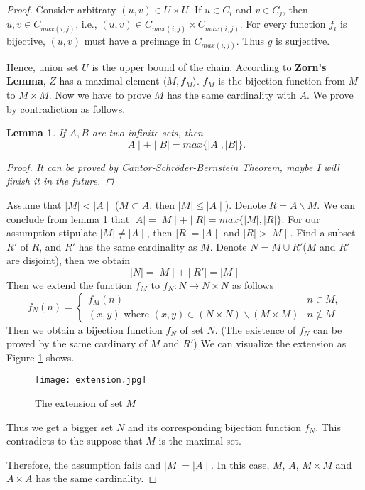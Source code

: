 \documentclass{article}
\newtheorem{lemma}[theorem]{Lemma}
\begin{document}
\begin{proof}
    Consider arbitraty $(u,v)\in U \times U.$ 
    If $u \in C_i$ and $v\in C_j$, then $u,v \in C_{max(i,j)}$,
     i.e., $(u,v)\in C_{max(i,j)} \times C_{max(i,j)}$. 
    For every function $f_i$ is bijective, $(u,v)$ must have a preimage in $C_{max(i,j)}$.
    Thus $g$ is surjective.

    Hence, union set $U$ is the upper bound of the chain.
    According to \textbf{Zorn's Lemma}, $Z$ has a maximal element $\langle M,f_M\rangle $.
    $f_M$ is the bijection function from $M$ to $M\times M.$
    Now we have to prove $M$ has the same cardinality with $A$.
    We prove by contradiction as follows.
    \begin{lemma}
        If $A,B$ are two infinite sets, then 
        $$\mid A\mid +\mid B\mid = max\{\mid A\mid,\mid B\mid\}.$$
    
        \begin{proof}
           It can be proved by Cantor-Schröder-Bernstein Theorem, 
           maybe I will finish it in the future.
        \end{proof}
    \end{lemma}

    Assume that $\mid M\mid < \mid A\mid$ ($M\subset A$, then $\mid M\mid \leq \mid A\mid$).
    Denote $R = A\backslash M.$ We can conclude from lemma 1 that 
    $\mid A \mid=\mid M\mid+\mid R\mid= max\{\mid M\mid,\mid R\mid\}.$ 
    For our assumption stipulate $\mid M\mid \not= \mid A\mid$,
     then $\mid R\mid = \mid A\mid$ and $\mid R\mid > \mid M\mid.$
    Find a subset $R'$ of $R$, and $R'$ has the same cardinality as $M$.
    Denote $N = M\cup R'$($M$ and $R'$ are disjoint), then we obtain
    $$\mid N\mid = \mid M\mid + \mid R'\mid = \mid M\mid$$
    Then we extend the function $f_M$ to $f_N: N\mapsto N\times N$ as follows
    \[
        f_N(n) = 
        \begin{cases}
            f_M(n) &  n \in M,\\
            (x,y) \text{ where }(x,y)\in (N\times N)\backslash (M\times M)& n\notin M
        \end{cases}
    \]
        Then we obtain a bijection function $f_N$ of set $N$. 
        (The existence of $f_N$ can be proved by the same cardinary of $M$ and $R'$)
    We can visualize the extension as Figure \ref{extension} shows.
    \begin{figure}[h]
        \centering
        \texttt{[image: extension.jpg]}
        \caption{The extension of set $M$}
        \label{extension}
    \end{figure}
    Thus we get a bigger set $N$ and its corresponding bijection function $f_N$.
    This contradicts to the suppose that  $M$ is the maximal set.

    Therefore, the assumption fails and $\mid M\mid = \mid A\mid$. In this case, $M$, $A$, $M\times M$
     and $A\times A$ has the same cardinality.
\end{proof}
\end{document}
